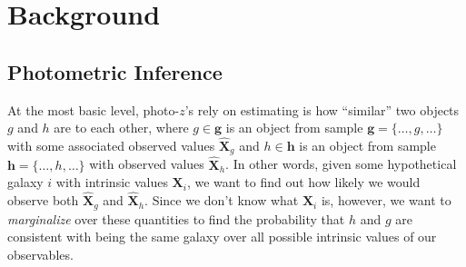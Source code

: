 \documentclass[a4paper,fleqn,usenatbib,english]{mnras}
\newcommand{\pz}{photo-$z$} %
\begin{document}

\section{Background}
\label{sec:background}

\subsection{Photometric Inference}
\label{subsec:phot_infer}

At the most basic level, {\pz}'s rely on estimating is how ``similar'' two objects $g$ and $h$ are to each other, where $g \in \mathbf{g}$ is an object from sample $\mathbf{g} = \lbrace \ldots,g,\ldots \rbrace$ with some associated observed values $\mathbf{\hat{X}}_g$ and $h \in \mathbf{h}$ is an object from sample $\mathbf{h}= \lbrace \ldots,h,\ldots \rbrace$ with observed values $\mathbf{\hat{X}}_h$. In other words, given some hypothetical galaxy $i$ with intrinsic values $\mathbf{X}_i$, we want to find out how likely we would observe both $\mathbf{\hat{X}}_g$ and $\mathbf{\hat{X}}_h$. Since we don't know what $\mathbf{X}_i$ is, however, we want to \textit{marginalize} over these quantities to find the probability that $h$ and $g$ are consistent with being the same galaxy over all possible intrinsic values of our observables.
\end{document}
